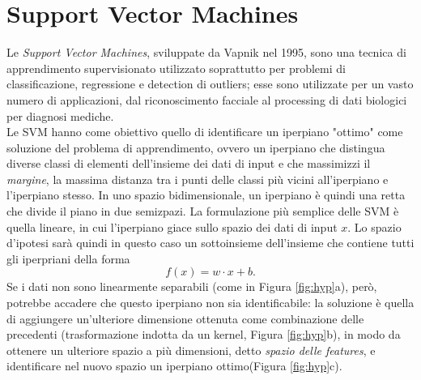 \documentclass[oneside, openany]{book}
\begin{document}
	\section{Support Vector Machines}
	Le \textit{Support Vector Machines}, sviluppate da Vapnik nel 1995, sono una tecnica di apprendimento supervisionato utilizzato soprattutto per problemi di classificazione, regressione e detection di outliers; esse sono utilizzate per un vasto numero di applicazioni, dal riconoscimento facciale al processing di dati biologici per diagnosi mediche.\\
	
	Le SVM hanno come obiettivo quello di identificare un iperpiano "ottimo" come soluzione del problema di apprendimento, ovvero un iperpiano che distingua diverse classi di elementi dell'insieme dei dati di input e che massimizzi il \textit{margine}, la massima distanza tra i punti delle classi più vicini all'iperpiano e l'iperpiano stesso. In uno spazio bidimensionale, un iperpiano è quindi una retta che divide il piano in due semizpazi. La formulazione più semplice delle SVM è quella lineare, in cui l'iperpiano giace sullo spazio dei dati di input $x$. Lo spazio d'ipotesi sarà quindi in questo caso un sottoinsieme dell'insieme che contiene tutti gli iperpriani della forma 
	\[
	f(x) = w\cdot x+b\text{.}
	\]
	Se i dati non sono linearmente separabili (come in Figura \ref{fig:hyp}a), però, potrebbe accadere che questo iperpiano non sia identificabile: la soluzione è quella di aggiungere un'ulteriore dimensione ottenuta come combinazione delle precedenti (trasformazione indotta da un kernel, Figura \ref{fig:hyp}b), in modo da ottenere un ulteriore spazio a più dimensioni, detto \textit{spazio delle features}, e identificare nel nuovo spazio un iperpiano ottimo(Figura \ref{fig:hyp}c).\\
\end{document}
